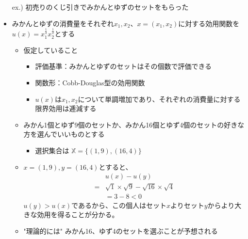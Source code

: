 \documentclass[dvipdfmx,11pt]{beamer}
\begin{document}
\begin{frame}{}
  \begin{itemize}
    \item[ex.)] 初売りのくじ引きでみかんとゆずのセットをもらった
     
   \item みかんとゆずの消費量をそれぞれ$x_1, x_2$、$x = (x_1, x_2)$に対する効用関数を$u(x) = x_1^{\frac{1}{2}}x_2^{\frac{1}{2}}$とする
    \begin{itemize}
      \item 仮定していること
      \begin{itemize}
        \item 評価基準：みかんとゆずのセットはその個数で評価できる
        \item 関数形：Cobb-Douglas型の効用関数
        \item $u(x)$は$x_1, x_2$について単調増加であり、それぞれの消費量に対する限界効用は逓減する
      \end{itemize}
      \item みかん1個とゆず9個のセットか、みかん16個とゆず4個のセットの好きな方を選んでいいものとする
      \begin{itemize}
        \item 選択集合は $\mathbb{X} = \{(1, 9), (16, 4)\}$
      \end{itemize}
      \item $x = (1, 9), y = (16, 4)$とすると、
      \begin{align*}
        & u(x) - u(y) \\
        =& \sqrt{1} \times \sqrt{9} - \sqrt{16} \times \sqrt{4} \\
        &= 3 - 8 < 0
      \end{align*}
      $u(y) > u(x)$であるから、この個人はセット$x$よりセット$y$からより大きな効用を得ることが分かる。
      \item "理論的には" みかん16、ゆず4のセットを選ぶことが予想される 
    \end{itemize}
  \end{itemize}
\end{frame}
\end{document}
